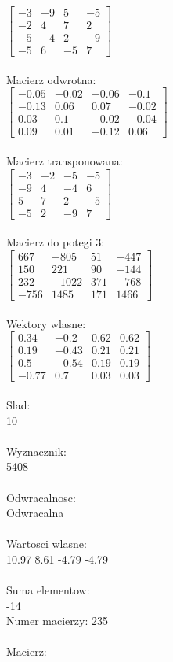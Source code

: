 \documentclass[a4paper,12pt]{article}
\begin{document}
$\begin{bmatrix} -3&-9&5&-5\\-2&4&7&2\\-5&-4&2&-9\\-5&6&-5&7 \end{bmatrix}$
\\
\\
Macierz odwrotna:\\

$\begin{bmatrix} -0.05&-0.02&-0.06&-0.1\\-0.13&0.06&0.07&-0.02\\0.03&0.1&-0.02&-0.04\\0.09&0.01&-0.12&0.06 \end{bmatrix}$
\\
\\
Macierz transponowana:\\

$\begin{bmatrix} -3&-2&-5&-5\\-9&4&-4&6\\5&7&2&-5\\-5&2&-9&7 \end{bmatrix}$
\\
\\
Macierz do potegi 3:\\

$\begin{bmatrix} 667&-805&51&-447\\150&221&90&-144\\232&-1022&371&-768\\-756&1485&171&1466 \end{bmatrix}$
\\
\\
Wektory wlasne:\\

$\begin{bmatrix} 0.34&-0.2&0.62&0.62\\0.19&-0.43&0.21&0.21\\0.5&-0.54&0.19&0.19\\-0.77&0.7&0.03&0.03 \end{bmatrix}$
\\
\\
Slad:\\
10
\\
\\
Wyznacznik:\\
5408
\\
\\
Odwracalnosc:\\
Odwracalna
\\
\\
Wartosci wlasne:\\
10.97 8.61 -4.79 -4.79
\\
\\
Suma elementow:\\
-14
\\
\newpage
Numer macierzy:
235
\\
\\
Macierz:\\
\end{document}
